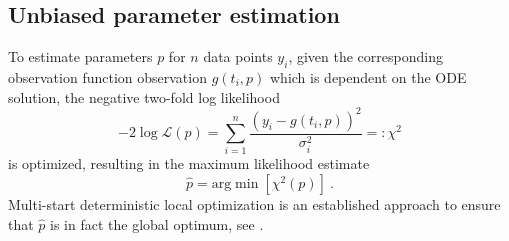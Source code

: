 \documentclass{bioinfo}
\begin{document}
\subsection{Unbiased parameter estimation}

To estimate parameters $p$ for $n$ data points ${y_i}$, given the corresponding observation function observation $g(t_i,p)$ which is dependent on the ODE solution, the negative two-fold log likelihood
\begin{equation}
-2\log \mathcal L(p) = \sum_{i=1}^n \frac{(y_i-g(t_i,p))^2}{\sigma_i^2} =: \chi^2\label{eq:lik}
\end{equation}
is optimized, resulting in the maximum likelihood estimate
\begin{equation}
\hat p = \text{arg}\min \left[ \chi^2(p) \right] \:.
\end{equation}
Multi-start deterministic local optimization is an established approach to ensure that $\hat p$ is in fact the global optimum, see \cite{Raue2013}.
\end{document}
